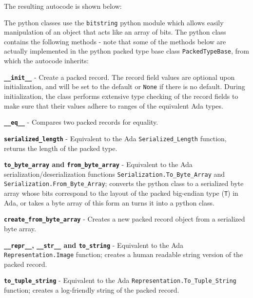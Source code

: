 The resulting autocode is shown below:


The python classes use the \texttt{bitstring} python module which allows easily manipulation of an object that acts like an array of bits. The python class contains the following methods - note that some of the methods below are actually implemented in the python packed type base class \texttt{PackedTypeBase}, from which the autocode inherits:

\vspace{5mm} %
\begin{spaceditemize}
  \item \textbf{\texttt{\_\_init\_\_}} - Create a packed record. The record field values are optional upon initialization, and will be set to the default or \texttt{None} if there is no default. During initialization, the class performs extensive type checking of the record fields to make sure that their values adhere to ranges of the equivalent Ada types.
  \item \textbf{\texttt{\_\_eq\_\_}} - Compares two packed records for equality.
  \item \textbf{\texttt{serialized\_length}} - Equivalent to the Ada \texttt{Serialized\_Length} function, returns the length of the packed type.
  \item \textbf{\texttt{to\_byte\_array} and \texttt{from\_byte\_array}} - Equivalent to the Ada serialization/deserialization functions \texttt{Serialization.To\_Byte\_Array} and \texttt{Serialization.From\_Byte\_Array}; converts the python class to a serialized byte array whose bits correspond to the layout of the packed big-endian type (\texttt{T}) in Ada, or takes a byte array of this form an turns it into a python class.
  \item \textbf{\texttt{create\_from\_byte\_array}} - Creates a new packed record object from a serialized byte array.
  \item \textbf{\texttt{\_\_repr\_\_}, \texttt{\_\_str\_\_} and \texttt{to\_string}} - Equivalent to the Ada \texttt{Representation.Image} function; creates a human readable string version of the packed record.
  \item \textbf{\texttt{to\_tuple\_string}} - Equivalent to the Ada \texttt{Representation.To\_Tuple\_String} function; creates a log-friendly string of the packed record.
\end{spaceditemize}
\vspace{5mm} %

